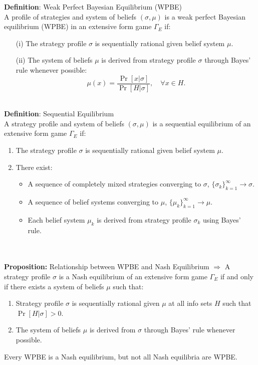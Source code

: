 \documentclass{article}
\begin{document}
\noindent \textbf{Definition}: Weak Perfect Bayesian Equilibrium (WPBE) \\
A profile of strategies and system of beliefs $(\sigma, \mu)$ is a weak perfect Bayesian equilibrium (WPBE) in an extensive form game $\Gamma_E$ if:
\begin{itemize}
    \item[(i)] The strategy profile $\sigma$ is sequentially rational given belief system $\mu$.
    \item[(ii)] The system of beliefs $\mu$ is derived from strategy profile $\sigma$ through Bayes’ rule whenever possible:
    \[
    \mu(x) = \frac{\Pr [x | \sigma]}{\Pr [H | \sigma]}, \quad \forall x \in H.
    \]
\end{itemize}
\\
\noindent \textbf{Definition}: Sequential Equilibrium \\
A strategy profile and system of beliefs $(\sigma, \mu)$ is a sequential equilibrium of an extensive form game $\Gamma_E$ if:
\begin{enumerate}
    \item The strategy profile $\sigma$ is sequentially rational given belief system $\mu$.
    \item There exist:
    \begin{itemize}
        \item A sequence of completely mixed strategies converging to $\sigma$, $\{\sigma_k\}_{k=1}^{\infty} \to \sigma$.
        \item A sequence of belief systems converging to $\mu$, $\{\mu_k\}_{k=1}^{\infty} \to \mu$.
        \item Each belief system $\mu_k$ is derived from strategy profile $\sigma_k$ using Bayes’ rule.
    \end{itemize}
\end{enumerate} 
\\
\\
\textbf{Proposition:} Relationship between WPBE and Nash Equilibrium $\Rightarrow$ A strategy profile $\sigma$ is a Nash equilibrium of an extensive form game $\Gamma_E$ if and only if there exists a system of beliefs $\mu$ such that:
\begin{enumerate}
    \item Strategy profile $\sigma$ is sequentially rational given $\mu$ at all info sets $H$ such that $\Pr [H | \sigma] > 0$.
    \item The system of beliefs $\mu$ is derived from $\sigma$ through Bayes’ rule whenever possible.
\end{enumerate}
Every WPBE is a Nash equilibrium, but not all Nash equilibria are WPBE.
\end{document}
